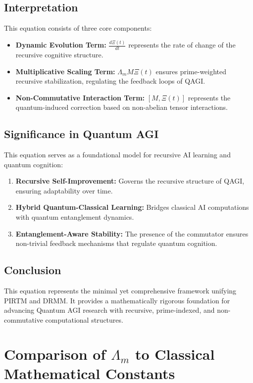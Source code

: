 \documentclass{article}
\theoremstyle{plain}
\begin{document}
\subsection{Interpretation}
This equation consists of three core components:
\begin{itemize}
    \item \textbf{Dynamic Evolution Term:} $\frac{d\Xi(t)}{dt}$ represents the rate of change of the recursive cognitive structure.
    \item \textbf{Multiplicative Scaling Term:} $\Lambda_m M \Xi(t)$ ensures prime-weighted recursive stabilization, regulating the feedback loops of QAGI.
    \item \textbf{Non-Commutative Interaction Term:} $[M, \Xi(t)]$ represents the quantum-induced correction based on non-abelian tensor interactions.
\end{itemize}

\subsection{Significance in Quantum AGI}
This equation serves as a foundational model for recursive AI learning and quantum cognition:
\begin{enumerate}
    \item \textbf{Recursive Self-Improvement:} Governs the recursive structure of QAGI, ensuring adaptability over time.
    \item \textbf{Hybrid Quantum-Classical Learning:} Bridges classical AI computations with quantum entanglement dynamics.
    \item \textbf{Entanglement-Aware Stability:} The presence of the commutator ensures non-trivial feedback mechanisms that regulate quantum cognition.
\end{enumerate}

\subsection{Conclusion}
This equation represents the minimal yet comprehensive framework unifying PIRTM and DRMM. It provides a mathematically rigorous foundation for advancing Quantum AGI research with recursive, prime-indexed, and non-commutative computational structures.

\section{Comparison of \(\Lambda_m\) to Classical Mathematical Constants}
\end{document}
